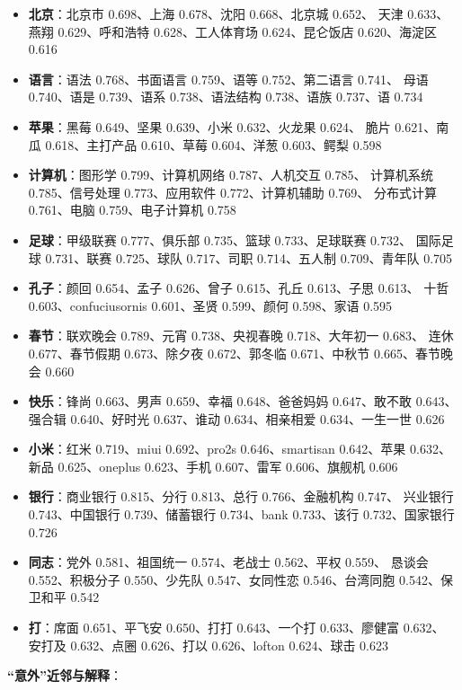 \documentclass[11pt,a4paper]{article}
\begin{document}
\begin{itemize}
  \item \textbf{北京}：北京市 0.698、上海 0.678、沈阳 0.668、北京城 0.652、
  天津 0.633、燕翔 0.629、呼和浩特 0.628、工人体育场 0.624、昆仑饭店 0.620、海淀区 0.616
  \item \textbf{语言}：语法 0.768、书面语言 0.759、语等 0.752、第二语言 0.741、
  母语 0.740、语是 0.739、语系 0.738、语法结构 0.738、语族 0.737、语 0.734
  \item \textbf{苹果}：黑莓 0.649、坚果 0.639、小米 0.632、火龙果 0.624、
  脆片 0.621、南瓜 0.618、主打产品 0.610、草莓 0.604、洋葱 0.603、鳄梨 0.598
  \item \textbf{计算机}：图形学 0.799、计算机网络 0.787、人机交互 0.785、
  计算机系统 0.785、信号处理 0.773、应用软件 0.772、计算机辅助 0.769、
  分布式计算 0.761、电脑 0.759、电子计算机 0.758
  \item \textbf{足球}：甲级联赛 0.777、俱乐部 0.735、篮球 0.733、足球联赛 0.732、
  国际足球 0.731、联赛 0.725、球队 0.717、司职 0.714、五人制 0.709、青年队 0.705
  \item \textbf{孔子}：颜回 0.654、孟子 0.626、曾子 0.615、孔丘 0.613、子思 0.613、
  十哲 0.603、confuciusornis 0.601、圣贤 0.599、颜何 0.598、家语 0.595
  \item \textbf{春节}：联欢晚会 0.789、元宵 0.738、央视春晚 0.718、大年初一 0.683、
  连休 0.677、春节假期 0.673、除夕夜 0.672、郭冬临 0.671、中秋节 0.665、春节晚会 0.660
  \item \textbf{快乐}：锋尚 0.663、男声 0.659、幸福 0.648、爸爸妈妈 0.647、敢不敢 0.643、
  强合辑 0.640、好时光 0.637、谁动 0.634、相亲相爱 0.634、一生一世 0.626
  \item \textbf{小米}：红米 0.719、miui 0.692、pro2s 0.646、smartisan 0.642、苹果 0.632、
  新品 0.625、oneplus 0.623、手机 0.607、雷军 0.606、旗舰机 0.606
  \item \textbf{银行}：商业银行 0.815、分行 0.813、总行 0.766、金融机构 0.747、
  兴业银行 0.743、中国银行 0.739、储蓄银行 0.734、bank 0.733、该行 0.732、国家银行 0.726
  \item \textbf{同志}：党外 0.581、祖国统一 0.574、老战士 0.562、平权 0.559、
  恳谈会 0.552、积极分子 0.550、少先队 0.547、女同性恋 0.546、台湾同胞 0.542、保卫和平 0.542
  \item \textbf{打}：席面 0.651、平飞安 0.650、打打 0.643、一个打 0.633、廖健富 0.632、
  安打及 0.632、点圈 0.626、打以 0.626、lofton 0.624、球击 0.623
\end{itemize}

\textbf{“意外”近邻与解释}：
\end{document}
